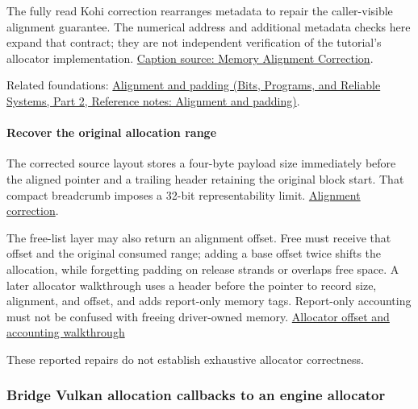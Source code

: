 The fully read Kohi correction rearranges metadata to repair the caller-visible alignment guarantee. The numerical address and additional metadata checks here expand that contract; they are not independent verification of the tutorial's allocator implementation. \href{https://www.youtube.com/watch?v=VQ6Q9B_WDlM}{Caption source: Memory Alignment Correction}.

Related foundations: \href{../01-Bits-Programs-and-Reliable-Systems-P02/main.pdf\#nameddest=appendix-a1f7c53b4742}{Alignment and padding (Bits, Programs, and Reliable Systems, Part 2, Reference notes: Alignment and padding)}.

\paragraph{Recover the original allocation range}\label{05-engine-i-ch014-recover-the-original-allocation-range}

\hypertarget{05-engine-i-ch014-recover-the-original-allocation-range}{}

The corrected source layout stores a four-byte payload size immediately before the aligned pointer and a trailing header retaining the original block start. That compact breadcrumb imposes a 32-bit representability limit. \href{https://www.youtube.com/watch?v=VQ6Q9B_WDlM}{Alignment correction}.

The free-list layer may also return an alignment offset. Free must receive that offset and the original consumed range; adding a base offset twice shifts the allocation, while forgetting padding on release strands or overlaps free space. A later allocator walkthrough uses a header before the pointer to record size, alignment, and offset, and adds report-only memory tags. Report-only accounting must not be confused with freeing driver-owned memory. \href{https://www.youtube.com/watch?v=Fo9ri9DMu74}{Allocator offset and accounting walkthrough}

These reported repairs do not establish exhaustive allocator correctness.

\subsubsection{Bridge Vulkan allocation callbacks to an engine allocator}\label{05-engine-i-ch014-bridge-vulkan-allocation-callbacks-to-an-engine-allocator}

\hypertarget{05-engine-i-ch014-bridge-vulkan-allocation-callbacks-to-an-engine-allocator}{}

